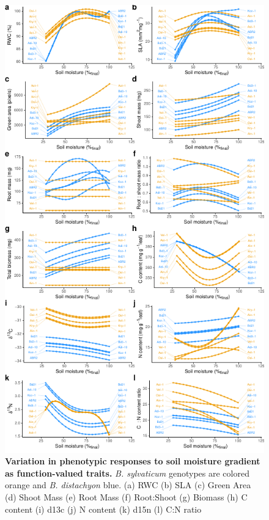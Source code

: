 \documentclass[jou,floatsintext]{apa6}
\begin{document}
\begin{figure}[!h]
\includegraphics[width=\textwidth]{../Figures/curves_byspecies} \caption{\textbf{Variation in phenotypic responses to soil moisture gradient as function-valued traits.} \emph{B. sylvaticum} genotypes are colored orange and \emph{B. distachyon} blue. (a) RWC (b) SLA (c) Green Area (d) Shoot Mass (e) Root Mass (f) Root:Shoot (g) Biomass (h) C content (i) d13c (j) N content (k) d15n (l) C:N ratio}\label{fig:curves}
\end{figure}
\end{document}

